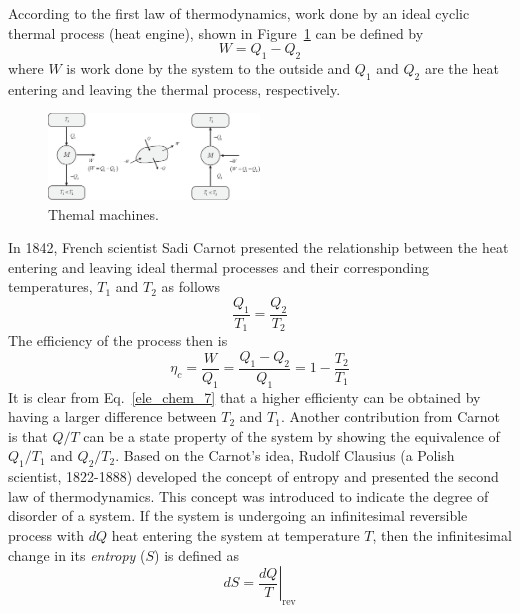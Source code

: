 \documentclass[11pt,a4paper]{article}
\numberwithin{equation}{section}
\theoremstyle{it}
\theoremstyle{definition}
\begin{document}
According to the first law of thermodynamics, work done by an ideal cyclic thermal process (heat engine), shown in Figure~\ref{thermal_machines} can be defined by
\begin{equation}\label{ele_chem_5}
	W=Q_1-Q_2
\end{equation}
where $W$ is work done by the system to the outside and $Q_1$ and $Q_2$ are the heat entering and leaving the thermal process, respectively.
\begin{figure}[H]
	\centering
	\includegraphics[width = 0.5\textwidth, width = 360pt, angle = 0, keepaspectratio]{figures/pem_fuel_cell/thermal_process.eps}
	\captionsetup{width=0.5\textwidth}		
	\caption{Themal machines.}
	\label{thermal_machines}
\end{figure}
In 1842, French scientist Sadi Carnot presented the relationship between the heat entering and leaving ideal thermal processes and their corresponding temperatures, $T_1$ and $T_2$ as follows
\begin{equation}\label{ele_chem_6}
	\frac{Q_1}{T_1}=\frac{Q_2}{T_2}
\end{equation}
The efficiency of the process then is 
\begin{equation}\label{ele_chem_7}
	\eta_c=\frac{W}{Q_1}=\frac{Q_1-Q_2}{Q_1} = 1-\frac{T_2}{T_1}
\end{equation}
It is clear from Eq.~\eqref{ele_chem_7} that a higher efficienty can be obtained by having a larger difference between $T_2$ and $T_1$.
Another contribution from Carnot is that $Q/T$ can be a state property of the system by showing the equivalence of $Q_1/T_1$ and $Q_2/T_2$. Based on the Carnot's idea, Rudolf Clausius (a Polish scientist, 1822-1888) developed the concept of entropy and presented the second law of thermodynamics. This concept was introduced to indicate the degree of disorder of a system. If the system is undergoing an infinitesimal reversible process with $dQ$ heat entering the system at temperature $T$, then the infinitesimal change in its \textit{entropy} ($S$) is defined as
\begin{equation}\label{ele_chem_8}
	dS=\left. \frac{dQ}{T}\right|_{\text{rev}}
\end{equation}
\end{document}
